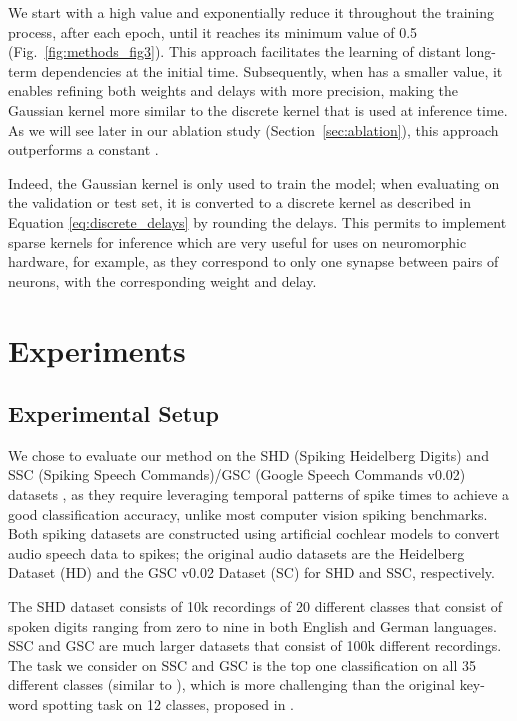\documentclass{article} \usepackage{iclr2024_conference,times}
\begin{document}
We start with a high  value and exponentially reduce it throughout the training process, after each epoch, until it reaches its minimum value of 0.5 (Fig.~\ref{fig:methods_fig3}). This approach facilitates the learning of distant long-term dependencies at the initial time. Subsequently, when  has a smaller value, it enables refining both weights and delays with more precision, making the Gaussian kernel more similar to the discrete kernel that is used at inference time. As we will see later in our ablation study (Section~\ref{sec:ablation}), this approach outperforms a constant .

Indeed, the Gaussian kernel is only used to train the model; when evaluating on the validation or test set, it is converted to a discrete kernel as described in Equation \ref{eq:discrete_delays} by rounding the delays. This permits to implement sparse kernels for inference which are very useful for uses on neuromorphic hardware, for example, as they correspond to only one synapse between pairs of neurons, with the corresponding weight and delay.












\section{Experiments}

\subsection{Experimental Setup}



We chose to evaluate our method on the SHD (Spiking Heidelberg Digits) and SSC (Spiking Speech Commands)/GSC (Google Speech Commands v0.02) datasets \citep{shd}, as they require leveraging temporal patterns of spike times to achieve a good classification accuracy, unlike most computer vision spiking benchmarks. Both spiking datasets are constructed using artificial cochlear models to convert audio speech data to spikes; the original audio datasets are the Heidelberg Dataset (HD) and the GSC v0.02 Dataset (SC) \citep{SC} for SHD and SSC, respectively. 

The SHD dataset consists of 10k recordings of 20 different classes that consist of spoken digits ranging from zero to nine in both English and German languages. SSC and GSC are much larger datasets that consist of 100k different recordings. The task we consider on SSC and GSC is the top one classification on all 35 different classes (similar to \citet{shd, baseline}), which is more challenging than the original key-word spotting task on 12 classes, proposed in \citet{SC}.
\end{document}
